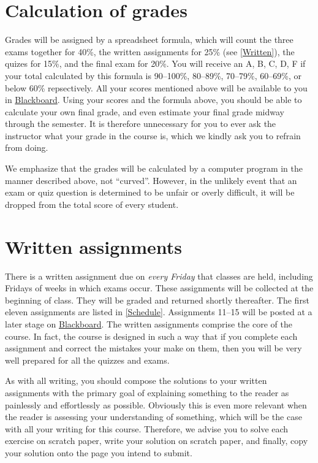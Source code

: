 \documentclass[11pt]{article}
\begin{document}
\section{Calculation of grades}\label{Assessment}
Grades will be assigned by a spreadsheet formula, which will count
the three exams together for 40\%, the written assignments for 25\% (see \autoref{Written}),
the quizes for 15\%, and the final exam for 20\%. You will receive an A, B, C, D, F
if your total calculated by this formula is
90--100\%, 80--89\%, 70--79\%, 60--69\%, or below 60\% repsectively.
All your scores mentioned above will be available to you in
\href{https://bb.its.iastate.edu}{Blackboard}. Using your scores
and the formula above, you should be able to calculate your own final grade,
and even estimate your final grade midway through the semester.
It is therefore unnecessary for you to ever ask the instructor
what your grade in the course is, which we kindly ask you to refrain from
doing.

We emphasize that the grades will be calculated by a computer program in the manner described
above, not ``curved''. However, in the unlikely event that an exam or quiz question is determined
to be unfair or overly difficult, it will be dropped from the total score of
every student.

\section{Written assignments}\label{Written}
There is a written assignment due on {\em every 
Friday} that classes are held, including Fridays of weeks
in which exams occur.
These assignments will be collected at the beginning
of class. They will be graded and returned shortly thereafter.
The first eleven assignments
are listed in \autoref{Schedule}. Assignments 11--15
will be posted at a later stage on \href{https://bb.its.iastate.edu}{Blackboard}.
The written assignments comprise the core of the course. In fact, the course is 
designed in such a way that if you complete each assignment and 
correct the mistakes your make on them,
then you will be very well prepared for all the quizzes and exams.

As with all writing, you should compose the solutions to your written
assignments with the primary goal of explaining something to the
reader as painlessly and effortlessly as possible. Obviously this
is even more relevant when the reader is assessing your understanding
of something, which will be the case with all your writing for this
course. Therefore, we advise you to solve each exercise on scratch
paper, write your solution on scratch paper, and finally, copy your
solution onto the page you intend to submit.
\end{document}
